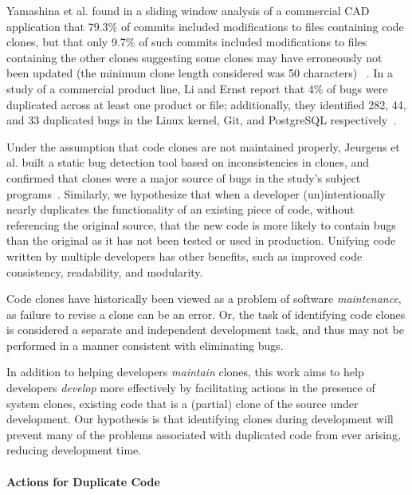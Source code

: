 \documentclass[nocopyrightspace,10pt]{sigplanconf}
\begin{document}
Yamashina et al. found in a sliding window analysis of a commercial CAD
application that 79.3\% of commits included modifications to files
containing code clones, but that only 9.7\% of such commits included
modifications to files containing the other
clones suggesting some clones may have erroneously not been updated
(the minimum clone length considered was 50 characters)
~\cite{Yamashina2008}. 
In a study of a commercial product line, Li and Ernst report that 4\%
of bugs were duplicated across at least one product or file;
additionally, they identified 282, 44, and 33 duplicated bugs in the
Linux kernel, Git, and PostgreSQL respectively~\cite{LiE2011}.


Under the assumption that code clones are not maintained properly,
Jeurgens et al. built a static bug detection tool based on
inconsistencies in clones, and confirmed that clones were a major
source of bugs in the study's subject programs~\cite{Juergens2009}.
Similarly, we hypothesize that when a developer (un)intentionally
nearly duplicates the functionality of an existing piece of code, without
referencing the original source, that the new code is more likely to
contain bugs than the original as it has not been tested or used in
production. Unifying code written by multiple developers has other 
benefits, such as improved code consistency, readability, and modularity.

Code clones have historically been viewed as a problem of software
\emph{maintenance}, as failure to revise a clone can be an error. 
Or, the task of identifying code clones is considered a separate and
independent development task, and thus may not be performed in a
manner consistent with eliminating bugs.

In addition to helping developers \emph{maintain} clones, this work
aims to help developers \emph{develop} more effectively by
facilitating actions in the presence of system clones, existing code
that is a (partial) clone of the source under development.  Our hypothesis
 is that identifying clones during development will prevent many of the problems
associated with duplicated code from ever arising, reducing development time.

\paragraph{Actions for Duplicate Code}
\end{document}
